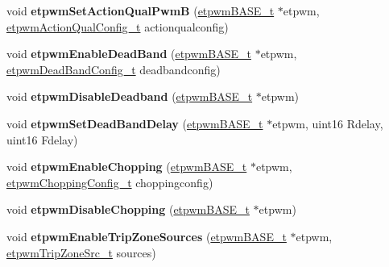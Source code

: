 \begin{DoxyCompactItemize}
\mbox{\label{group__ePWM_gae253bd555aec84fb5d4fd69524fcd3a2}} 
void {\bfseries etpwm\+Set\+Action\+Qual\+PwmB} (\mbox{\hyperlink{reg__etpwm_8h_a3030c3a8f18ffd60ee3de5bbd7632891}{etpwm\+B\+A\+S\+E\+\_\+t}} $\ast$etpwm, \mbox{\hyperlink{structetpwmActionQualConfig__t}{etpwm\+Action\+Qual\+Config\+\_\+t}} actionqualconfig)
\item 
\mbox{\label{group__ePWM_ga109b5d949cccd650645369311b71bc3f}} 
void {\bfseries etpwm\+Enable\+Dead\+Band} (\mbox{\hyperlink{reg__etpwm_8h_a3030c3a8f18ffd60ee3de5bbd7632891}{etpwm\+B\+A\+S\+E\+\_\+t}} $\ast$etpwm, \mbox{\hyperlink{structetpwmDeadBandConfig__t}{etpwm\+Dead\+Band\+Config\+\_\+t}} deadbandconfig)
\item 
\mbox{\label{group__ePWM_ga012b9be3d64af1eea91ec720bd74d450}} 
void {\bfseries etpwm\+Disable\+Deadband} (\mbox{\hyperlink{reg__etpwm_8h_a3030c3a8f18ffd60ee3de5bbd7632891}{etpwm\+B\+A\+S\+E\+\_\+t}} $\ast$etpwm)
\item 
\mbox{\label{group__ePWM_ga9b1b466b161f61dd97755536388a8de1}} 
void {\bfseries etpwm\+Set\+Dead\+Band\+Delay} (\mbox{\hyperlink{reg__etpwm_8h_a3030c3a8f18ffd60ee3de5bbd7632891}{etpwm\+B\+A\+S\+E\+\_\+t}} $\ast$etpwm, uint16 Rdelay, uint16 Fdelay)
\item 
\mbox{\label{group__ePWM_gaa93d45f2d2d85b940737a8d0688463d1}} 
void {\bfseries etpwm\+Enable\+Chopping} (\mbox{\hyperlink{reg__etpwm_8h_a3030c3a8f18ffd60ee3de5bbd7632891}{etpwm\+B\+A\+S\+E\+\_\+t}} $\ast$etpwm, \mbox{\hyperlink{structetpwmChoppingConfig__t}{etpwm\+Chopping\+Config\+\_\+t}} choppingconfig)
\item 
\mbox{\label{group__ePWM_gaae886fc963534569426429deee67a28e}} 
void {\bfseries etpwm\+Disable\+Chopping} (\mbox{\hyperlink{reg__etpwm_8h_a3030c3a8f18ffd60ee3de5bbd7632891}{etpwm\+B\+A\+S\+E\+\_\+t}} $\ast$etpwm)
\item 
\mbox{\label{group__ePWM_gaa8e5fda67f044423912ead101387d0f4}} 
void {\bfseries etpwm\+Enable\+Trip\+Zone\+Sources} (\mbox{\hyperlink{reg__etpwm_8h_a3030c3a8f18ffd60ee3de5bbd7632891}{etpwm\+B\+A\+S\+E\+\_\+t}} $\ast$etpwm, \mbox{\hyperlink{etpwm_8h_a61fc897f82f511a0da2493cd1629cc83}{etpwm\+Trip\+Zone\+Src\+\_\+t}} sources)

\end{DoxyCompactItemize}
